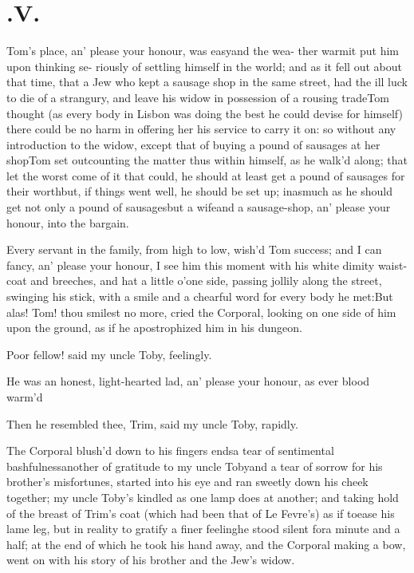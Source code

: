 \documentclass{article}
\begin{document}
\vfill{}\eject
\null{}\baselineskip
\section{.\enspace V.}

 Tom’s place, an’ please your\break
honour, was easy\tsk and the wea-\break 
ther warm\tsk it put him upon thinking se-\break
riously of
settling himself in the world; and as it fell out about that time, that a Jew who
kept a sausage shop in the same street, had the ill luck to die of a strangury, and
leave his widow in possession of a rousing trade\tsh Tom thought (as every body in
Lisbon was doing the best he could devise for himself) there could be no harm in
offering her his service to carry it on: so without any introduction to the widow,
except that of buying a pound of sausages at her shop\tsk Tom set out\tsk counting
the matter thus within\etp{} himself, as he walk’d along; that let the
worst come of it that could, he should at least get a pound of sausages for their
worth\tsk but, if things went well, he should be set up; inasmuch as he should get
not only a pound of sausages\tsk but a wife\tsk and a sausage-shop, an’ please your
honour, into the bargain.

Every servant in the family, from high to low, wish’d Tom success; and I can fancy,
an’ please your honour, I see him this moment with his white dimity waist-coat and
breeches, and hat a little o’\thinspace one side, passing jollily along the street, swinging
his stick, with a smile and a chearful word for every body he met:\break\tsh But alas!
Tom!  thou smilest no more, cried the Corporal, looking on one side of him upon the
ground, as if he apostrophized him in his dungeon.

Poor fellow! said my uncle Toby, feelingly.

He was an honest, light-hearted lad, an’ please your honour, as ever blood warm’d
\tsh

\tsh Then he resembled thee, Trim, said my uncle Toby, rapidly.

The Corporal blush’d down to his fingers ends\tsk a tear of sentimental
bashfulness\tsk another of gratitude to my uncle Toby\tsk and a tear of sorrow for
his brother’s misfortunes, started into his eye and ran sweetly down his cheek
together; my uncle Toby’s kindled as one lamp does at another; and
taking hold of the breast of Trim’s coat (which had been that of Le Fevre’s) as if
to\break ease his lame leg, but in reality to gratify a finer feeling\tsh he stood
silent for\break a minute and a half; at the end of which he took his hand away, and
the Corporal making a bow, went on with his story of his brother and the Jew’s
widow.
\end{document}
